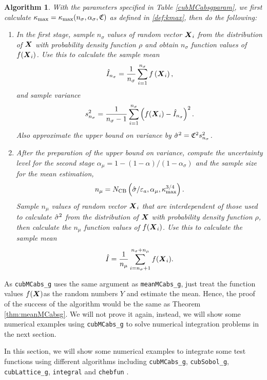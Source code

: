 \documentclass{iitthesis}
\newtheorem{algorithm}[theorem]{Algorithm}
\theoremstyle{definition}
\begin{document}
\begin{algorithm}
With the parameters specified in Table \ref{cubMCabsgparam}, we first calculate $\kappa_{\max}=\kappa_{\max}(n_\sigma,\alpha_\sigma,\mathfrak{C})$ as defined in \eqref{def:kmax}, then do the following:
\begin{enumerate}
\item In the first stage, sample $n_\sigma$ values of random vector $\boldsymbol{X}_i$ from the distribution of $\boldsymbol{X}$ with probability density function $\rho$ and obtain $n_\sigma$ function values of $f(\boldsymbol{X}_i)$. Use this to calculate the sample mean $$\hat{I}_{n_\sigma} = \frac{1}{n_\sigma}\sum_{i=1}^{n_\sigma} f\left(\boldsymbol{X}_i\right),$$ and sample variance $$s_{n_\sigma}^2 = \frac{1}{n_\sigma-1}\sum_{i=1}^{n_\sigma} \left(f(\boldsymbol{X}_i)-\hat{I}_{n_\sigma}\right)^2.$$ Also approximate the upper bound on variance by $\hat{\sigma}^2 = \mathfrak{C}^2 s^2_{n_\sigma}$. 

\item After the preparation of the upper bound on variance, compute the uncertainty level for the second stage $\alpha_\mu = 1-(1-\alpha)/(1-\alpha_{\sigma})$ and the sample size for the mean estimation,
\begin{align}
n_\mu = N_{\text{CB}} \left(\hat{\sigma}/\varepsilon_a,\alpha_\mu, \kappa_{\max}^{3/4}\right).
\end{align}
Sample $n_\mu$ values of random vector $\boldsymbol{X}_i$ that are interdependent of those used to calculate $\hat{\sigma}^2$ from the distribution of $\boldsymbol{X}$ with probability density function $\rho$, then calculate the $n_\mu$ function values of $f(\boldsymbol{X}_i)$. Use this to calculate the sample mean 
\begin{align}\label{hmun}
\hat{I}= \frac{1}{n_\mu}\sum_{i = n_\sigma+1}^{n_\sigma+n_\mu}f(\boldsymbol{X}_i).
\end{align}
\end{enumerate}
\end{algorithm}
As {\tt cubMCabs\_g} uses the same argument as {\tt meanMCabs\_g}, just treat the function values $f(\boldsymbol{X}) $as the random numbers $Y$ and estimate the mean. Hence, the proof of the success of the algorithm would be the same as Theorem \ref{thm:meanMCabsg}. We will not prove it again,  instead, we will show some numerical examples using {\tt cubMCabs\_g} to solve numerical integration problems in the next section.


In this section, we will show some numerical examples to integrate some test functions using different algorithms including {\tt cubMCabs\_g}, {\tt cubSobol\_g}\cite{HicJim16a},\\ {\tt cubLattice\_g}\cite{JimHic16a}, {\tt integral}\cite{Shampone08} and {\tt chebfun} \cite{Chebfun14}.
\end{document}
